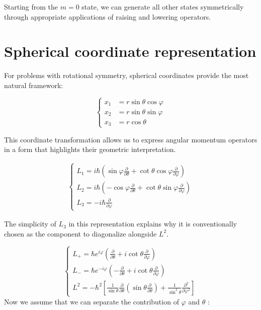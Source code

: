 Starting from the $m=0$ state, we can generate all other states symmetrically through appropriate applications of raising and lowering operators.

\section{Spherical coordinate representation}
For problems with rotational symmetry, spherical coordinates provide the most natural framework:

\[
\begin{cases}x_{1} & =r \sin \theta \cos \varphi  \\ x_{2} & =r \sin \theta \sin \varphi \\ x_{3} & =r \cos \theta\end{cases}
\]

This coordinate transformation allows us to express angular momentum operators in a form that highlights their geometric interpretation.

\begin{align}
\left\{\begin{array}{l}
L_{1} = i \hbar\left(\sin \varphi \frac{\partial}{\partial \theta}+\cot \theta \cos \varphi \frac{\partial}{\partial \varphi}\right)  \\
L_{2} = i \hbar\left(-\cos \varphi \frac{\partial}{\partial \theta}+\cot \theta \sin \varphi \frac{\partial}{\partial \varphi}\right) \\
L_{3} = -i \hbar \frac{\partial}{\partial \varphi}
\end{array}\right.
\end{align}

The simplicity of $L_3$ in this representation explains why it is conventionally chosen as the component to diagonalize alongside $L^2$.

\[
\left\{\begin{array}{l}
L_{+}=\hbar e^{i \varphi}\left(\frac{\partial}{\partial \theta}+i \cot \theta \frac{\partial}{\partial \varphi}\right)  \\
L_{-}=\hbar e^{-i \varphi}\left(-\frac{\partial}{\partial \theta}+i \cot \theta \frac{\partial}{\partial \varphi}\right) \\
L^{2}=-\hbar^{2}\left[\frac{1}{\sin \theta} \frac{\partial}{\partial \theta}\left(\sin \theta \frac{\partial}{\partial \theta}\right)+\frac{1}{\sin ^{2} \theta} \frac{\partial^{2}}{\partial \varphi^{2}}\right]
\end{array}\right.
\]
Now we assume that we can separate the contribution of $\varphi$ and $\theta$ :

